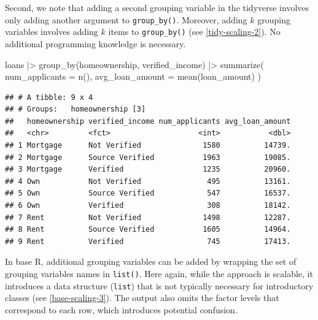 \documentclass[12pt]{article}
\newenvironment{Shaded}{\begin{snugshade}}{\end{snugshade}}
\newcommand{\AttributeTok}[1]{\textcolor[rgb]{0.77,0.63,0.00}{#1}}
\newcommand{\FunctionTok}[1]{\textcolor[rgb]{0.00,0.00,0.00}{#1}}
\newcommand{\NormalTok}[1]{#1}
\newcommand{\SpecialCharTok}[1]{\textcolor[rgb]{0.00,0.00,0.00}{#1}}
\begin{document}

\label{base-scaling-2} \linespread{2}
\vspace{3mm}\setlength{\parindent}{15pt}

Second, we note that adding a second grouping variable in the tidyverse
involves only adding another argument to \texttt{group\_by()}. Moreover,
adding \(k\) grouping variables involves adding \(k\) items to
\texttt{group\_by()} (see \ref{tidy-scaling-2}). No additional
programming knowledge is necessary.

\linespread{1}

\begin{Shaded}
\begin{Highlighting}[]
\NormalTok{loans }\SpecialCharTok{|\textgreater{}}
  \FunctionTok{group\_by}\NormalTok{(homeownership, verified\_income) }\SpecialCharTok{|\textgreater{}}
  \FunctionTok{summarize}\NormalTok{(}
    \AttributeTok{num\_applicants =} \FunctionTok{n}\NormalTok{(),}
    \AttributeTok{avg\_loan\_amount =} \FunctionTok{mean}\NormalTok{(loan\_amount)}
\NormalTok{  )}
\end{Highlighting}
\end{Shaded}

\begin{verbatim}
## # A tibble: 9 x 4
## # Groups:   homeownership [3]
##   homeownership verified_income num_applicants avg_loan_amount
##   <chr>         <fct>                    <int>           <dbl>
## 1 Mortgage      Not Verified              1580          14739.
## 2 Mortgage      Source Verified           1963          19085.
## 3 Mortgage      Verified                  1235          20960.
## 4 Own           Not Verified               495          13161.
## 5 Own           Source Verified            547          16537.
## 6 Own           Verified                   308          18142.
## 7 Rent          Not Verified              1498          12287.
## 8 Rent          Source Verified           1605          14964.
## 9 Rent          Verified                   745          17413.
\end{verbatim}


\label{tidy-scaling-2} \linespread{2}
\vspace{3mm}\setlength{\parindent}{15pt}

In base R, additional grouping variables can be added by wrapping the
set of grouping variables names in \texttt{list()}. Here again, while
the approach is scalable, it introduces a data structure (\texttt{list})
that is not typically necessary for introductory classes (see
\ref{base-scaling-3}). The output also omits the factor levels that
correspond to each row, which introduces potential confusion.
\end{document}
